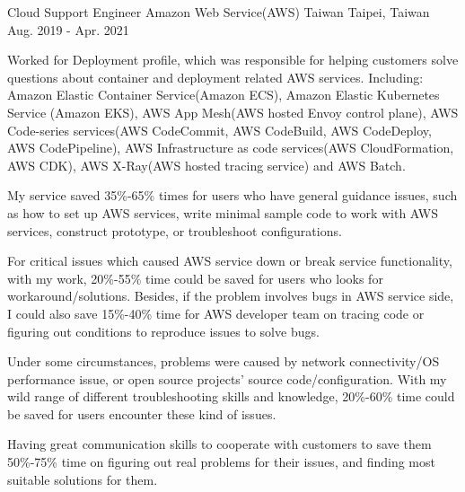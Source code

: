 \begin{cventries}
    \cventry
        {Cloud Support Engineer}
        {Amazon Web Service(AWS) Taiwan}
        {Taipei, Taiwan}
        {Aug. 2019 - Apr. 2021}
        {
            \begin{cvitems}
                \item
                    {
                        Worked for Deployment profile, which was responsible for helping customers solve questions about container and deployment related AWS services. Including: Amazon Elastic Container Service(Amazon ECS), Amazon Elastic Kubernetes Service (Amazon EKS), AWS App Mesh(AWS hosted Envoy control plane), AWS Code-series services(AWS CodeCommit, AWS CodeBuild, AWS CodeDeploy, AWS CodePipeline), AWS Infrastructure as code services(AWS CloudFormation, AWS CDK), AWS X-Ray(AWS hosted tracing service) and AWS Batch.
                    }
                \item
                    {
                        My service saved 35\%-65\% times for users who have general guidance issues, such as how to set up AWS services, write minimal sample code to work with AWS services, construct prototype, or troubleshoot configurations. 
                    }
                \item
                    {
                        For critical issues which caused AWS service down or break service functionality, with my work, 20\%-55\% time could be saved for users who looks for workaround/solutions. Besides, if the problem involves bugs in AWS service side, I could also save 15\%-40\% time for AWS developer team on tracing code or figuring out conditions to reproduce issues to solve bugs.
                    }
                \item
                    {
                        Under some circumstances, problems were caused by network connectivity/OS performance issue, or open source projects' source code/configuration. With my wild range of different troubleshooting skills and knowledge, 20\%-60\% time could be saved for users encounter these kind of issues.
                    }
                \item
                    {
                        Having great communication skills to cooperate with customers to save them 50\%-75\% time on figuring out real problems for their issues, and finding most suitable solutions for them.
                    }
            \end{cvitems}
        }


\end{cventries}
